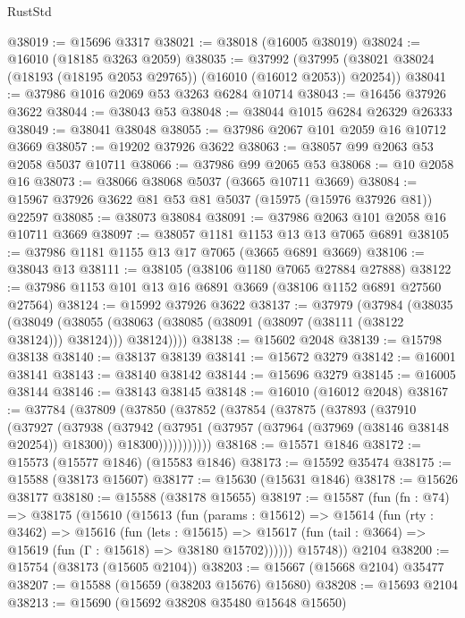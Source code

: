 \begin{lexlean}{RustStd}
\begin{coremodule}
@38019 := @15696 @3317
@38021 := @38018 (@16005 @38019)
@38024 := @16010 (@18185 @3263 @2059)
@38035 := @37992
    (@37995 (@38021 @38024 (@18193 (@18195 @2053 @29765)) (@16010 (@16012 @2053)) @20254))
@38041 := @37986 @1016 @2069 @53 @3263 @6284 @10714
@38043 := @16456 @37926 @3622
@38044 := @38043 @53
@38048 := @38044 @1015 @6284 @26329 @26333
@38049 := @38041 @38048
@38055 := @37986 @2067 @101 @2059 @16 @10712 @3669
@38057 := @19202 @37926 @3622
@38063 := @38057 @99 @2063 @53 @2058 @5037 @10711
@38066 := @37986 @99 @2065 @53
@38068 := @10 @2058 @16
@38073 := @38066 @38068 @5037 (@3665 @10711 @3669)
@38084 := @15967 @37926 @3622 @81 @53 @81 @5037 (@15975 (@15976 @37926 @81)) @22597
@38085 := @38073 @38084
@38091 := @37986 @2063 @101 @2058 @16 @10711 @3669
@38097 := @38057 @1181 @1153 @13 @13 @7065 @6891
@38105 := @37986 @1181 @1155 @13 @17 @7065 (@3665 @6891 @3669)
@38106 := @38043 @13
@38111 := @38105 (@38106 @1180 @7065 @27884 @27888)
@38122 := @37986 @1153 @101 @13 @16 @6891 @3669 (@38106 @1152 @6891 @27560 @27564)
@38124 := @15992 @37926 @3622
@38137 := @37979
    (@37984
      (@38035
        (@38049
          (@38055 (@38063 (@38085 (@38091 (@38097 (@38111 (@38122 @38124))) @38124))) @38124))))
@38138 := @15602 @2048
@38139 := @15798 @38138
@38140 := @38137 @38139
@38141 := @15672 @3279
@38142 := @16001 @38141
@38143 := @38140 @38142
@38144 := @15696 @3279
@38145 := @16005 @38144
@38146 := @38143 @38145
@38148 := @16010 (@16012 @2048)
@38167 := @37784
    (@37809
      (@37850
        (@37852
          (@37854
            (@37875
              (@37893
                (@37910
                  (@37927
                    (@37938
                      (@37942
                        (@37951
                          (@37957 (@37964 (@37969 (@38146 @38148 @20254)) @18300))
                          @18300)))))))))))
@38168 := @15571 @1846
@38172 := @15573 (@15577 @1846) (@15583 @1846)
@38173 := @15592 @35474
@38175 := @15588 (@38173 @15607)
@38177 := @15630 (@15631 @1846)
@38178 := @15626 @38177
@38180 := @15588 (@38178 @15655)
@38197 := @15587
    (fun (fn : @74) =>
    @38175
      (@15610
        (@15613
          (fun (params : @15612) =>
          @15614
            (fun (rty : @3462) =>
            @15616
              (fun (lets : @15615) =>
              @15617 (fun (tail : @3664) => @15619 (fun (Γ : @15618) => @38180 @15702))))))
        @15748))
    @2104
@38200 := @15754 (@38173 (@15605 @2104))
@38203 := @15667 (@15668 @2104) @35477
@38207 := @15588 (@15659 (@38203 @15676) @15680)
@38208 := @15693 @2104
@38213 := @15690 (@15692 @38208 @35480 @15648 @15650)

\end{coremodule}
\end{lexlean}

